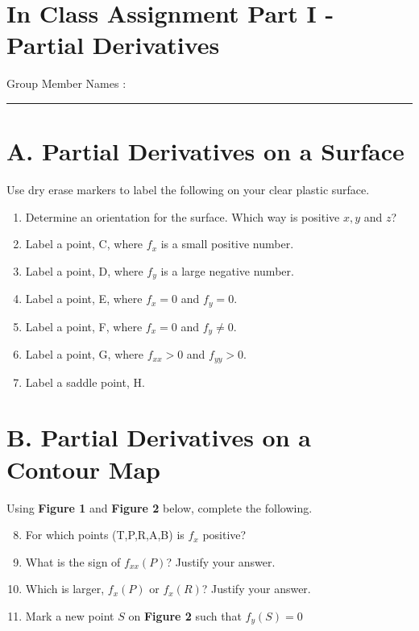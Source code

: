 \documentclass[11pt]{article}
\begin{document}



\section*{In Class Assignment Part I - Partial Derivatives}
\vspace{-4mm}
Group Member Names : 

\bigskip\hrule


\vspace{-6mm}

\section*{A. Partial Derivatives on a Surface}
\vspace{-4mm}
Use dry erase markers to label the following on your clear plastic surface.
\vspace{-4mm}
\begin{enumerate}
    \item Determine an orientation for the surface. Which way is positive $x,y$ and $z$?
    \item Label a point, C, where $f_x$ is a small positive number.
    \item Label a point, D, where $f_y$ is a large negative number.
    \item Label a point, E, where $f_x=0$ and $f_y = 0$.
    \item Label a point, F, where $f_x=0$ and $f_y \neq 0$.
    \item Label a point, G, where $f_{xx} > 0$ and $f_{yy} >0$.
    \item Label a saddle point, H.
\end{enumerate}
\hline 
\vspace{-6mm}
\section*{B. Partial Derivatives on a Contour Map}
\vspace{-4mm}
Using \textbf{Figure 1} and \textbf{Figure 2} below, complete the following.
\begin{enumerate}
    \setcounter{enumi}{7}
    \item For which points (T,P,R,A,B) is $f_x$ positive?
    \vfill 
    \item What is the sign of $f_{xx}(P)$? Justify your answer.
    \vfill 
    \item Which is larger, $f_x(P)$ or $f_x(R)$? Justify your answer.
    \vfill 
    \item Mark a new point $S$ on \textbf{Figure 2} such that $f_y(S)=0$
\end{enumerate}
\end{document}
